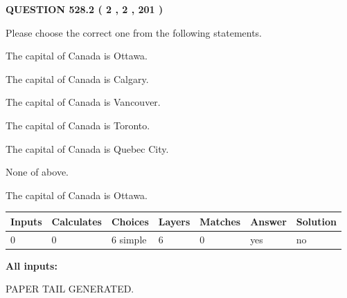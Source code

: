 \documentclass[12pt]{article}
\begin{document}
\vspace{0.2in}
  
{\textbf{\Large{QUESTION
528.2 
 ( 2 , 2 , 201 )
}}}
  
  
Please choose the correct one from the following statements.
 
 
The capital of Canada is Ottawa.
 
 
The capital of Canada is Calgary.
 
 
The capital of Canada is Vancouver.
 
 
The capital of Canada is Toronto.
 
 
The capital of Canada is Quebec City.
 
 
 None of above.
 
 
\noindent{}
 
 
The capital of Canada is Ottawa.
 
 
\noindent{}
 
 
   
   
   
   
\noindent\begin{tabular}{|l|l|l|l|l|l|l|}
 \hline
Inputs & Calculates & Choices & Layers & Matches & Answer & Solution \\ \hline
 0  & 
 0  & 
 6
  simple  
  & 
 6  & 
 0  & 
  yes & 
  no 
  \\ \hline
 \end{tabular}
   
   
   
   
\noindent{}
   
   
   
   
\noindent\vspace{0.1in}\hspace{-0.08in} {\textbf{\Large{All inputs: }}}
   
   
   
   
   
   
 \vspace{0.2in}
 
   
   
\vspace{2.0in} PAPER TAIL GENERATED.
   
\end{document}
